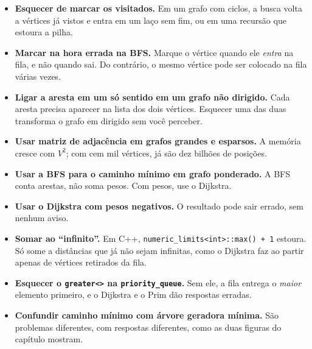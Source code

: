 \begin{itemize}
  \item \textbf{Esquecer de marcar os visitados.} Em um grafo com ciclos, a busca volta a vértices já vistos e entra em um laço sem fim, ou em uma recursão que estoura a pilha.
  \item \textbf{Marcar na hora errada na BFS.} Marque o vértice quando ele \textit{entra} na fila, e não quando sai. Do contrário, o mesmo vértice pode ser colocado na fila várias vezes.
  \item \textbf{Ligar a aresta em um só sentido em um grafo não dirigido.} Cada aresta precisa aparecer na lista dos dois vértices. Esquecer uma das duas transforma o grafo em dirigido sem você perceber.
  \item \textbf{Usar matriz de adjacência em grafos grandes e esparsos.} A memória cresce com $V^2$; com cem mil vértices, já são dez bilhões de posições.
  \item \textbf{Usar a BFS para o caminho mínimo em grafo ponderado.} A BFS conta arestas, não soma pesos. Com pesos, use o Dijkstra.
  \item \textbf{Usar o Dijkstra com pesos negativos.} O resultado pode sair errado, sem nenhum aviso.
  \item \textbf{Somar ao ``infinito''.} Em C++, \texttt{numeric\_limits<int>::max() + 1} estoura. Só some a distâncias que já não sejam infinitas, como o Dijkstra faz ao partir apenas de vértices retirados da fila.
  \item \textbf{Esquecer o \texttt{greater<>} na \texttt{priority\_queue}.} Sem ele, a fila entrega o \textit{maior} elemento primeiro, e o Dijkstra e o Prim dão respostas erradas.
  \item \textbf{Confundir caminho mínimo com árvore geradora mínima.} São problemas diferentes, com respostas diferentes, como as duas figuras do capítulo mostram.
\end{itemize}
